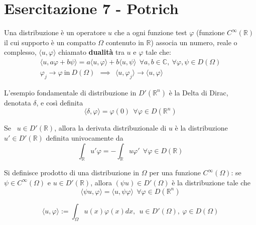 \chapter{Esercitazione 7 - Potrich}
\ParteEsercizi
\begin{defn}
[Distribuzione] Una distribuzione è un operatore $u$ che a ogni funzione test $\varphi $ (funzione $C^{\infty }(\mathbb{R})$ il cui supporto è un compatto $\Omega $ contenuto in $\mathbb{R}$) associa un numero, reale o complesso, $\langle u,\varphi \rangle $ chiamato \textbf{dualità} tra $u$ e $\varphi $ tale che:
\begin{equation*}
\begin{array}{ l }
\langle u,a\varphi +b\psi \rangle =a\langle u,\varphi \rangle +b\langle u,\psi \rangle \ \ \forall a,b\in \mathbb{C} ,\ \forall \varphi ,\psi \in D( \Omega )\\
\varphi _{j}\rightarrow \varphi \ \text{in} \ D( \Omega ) \ \ \implies \ \ \langle u,\varphi _{j} \rangle \rightarrow \langle u,\varphi \rangle 
\end{array}
\end{equation*}
\end{defn}
\begin{rem}
 L'esempio fondamentale di distribuzione in $D'\left(\mathbb{R}^{n}\right)$ è la Delta di Dirac, denotata $\delta $, e così definita
\begin{equation*}
\langle \delta ,\varphi \rangle =\varphi ( 0) \ \ \forall \varphi \in D\left(\mathbb{R}^{n}\right)
\end{equation*}
\end{rem}
\begin{defn}
Se \ $u\in D'(\mathbb{R})$, allora la derivata distribuzionale di $u$ è la distribuzione $u'\in D'(\mathbb{R})$ definita univocamente da
\begin{equation*}
\int _{\mathbb{R}} u'\varphi =-\int _{\mathbb{R}} u\varphi '\ \ \forall \varphi \in D(\mathbb{R})
\end{equation*}
\end{defn}
\begin{defn}
Si definisce prodotto di una distribuzione in $\Omega $ per una funzione $C^{\infty }( \Omega )$: se $\psi \in C^{\infty }( \Omega )$ e $u\in D'(\mathbb{R})$, allora $( \psi u) \in D'( \Omega )$ è la distribuzione tale che
\begin{equation*}
\langle \psi u,\varphi \rangle =\langle u,\psi \varphi \rangle \ \ \forall \varphi \in D\left(\mathbb{R}^{n}\right)
\end{equation*}
\end{defn}
\begin{rem}
\begin{equation*}
\langle u,\varphi \rangle :=\int _{\Omega } u( x) \varphi ( x) dx,\ \ u\in D'( \Omega ) ,\ \varphi \in D( \Omega )
\end{equation*}
\end{rem}
\Esercizio{}

